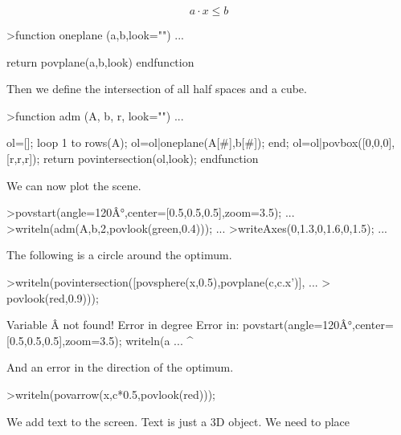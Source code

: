 \documentclass[a4paper,10pt]{article}
\begin{document}
\begin{eulernotebook}
\begin{eulercomment}
\end{eulercomment}
\begin{eulerformula}
\[
a \cdot x \le b
\]
\end{eulerformula}
\begin{eulerprompt}
>function oneplane (a,b,look="") ...
\end{eulerprompt}
\begin{eulerudf}
    return povplane(a,b,look)
  endfunction
\end{eulerudf}
\begin{eulercomment}
Then we define the intersection of all half spaces and a cube.
\end{eulercomment}
\begin{eulerprompt}
>function adm (A, b, r, look="") ...
\end{eulerprompt}
\begin{eulerudf}
    ol=[];
    loop 1 to rows(A); ol=ol|oneplane(A[#],b[#]); end;
    ol=ol|povbox([0,0,0],[r,r,r]);
    return povintersection(ol,look);
  endfunction
\end{eulerudf}
\begin{eulercomment}
We can now plot the scene.
\end{eulercomment}
\begin{eulerprompt}
>povstart(angle=120Â°,center=[0.5,0.5,0.5],zoom=3.5); ...
>writeln(adm(A,b,2,povlook(green,0.4))); ...
>writeAxes(0,1.3,0,1.6,0,1.5); ...
\end{eulerprompt}
\begin{eulercomment}
The following is a circle around the optimum.
\end{eulercomment}
\begin{eulerprompt}
>writeln(povintersection([povsphere(x,0.5),povplane(c,c.x')], ...
>  povlook(red,0.9)));
\end{eulerprompt}
\begin{euleroutput}
  Variable Â not found!
  Error in degree
  Error in:
  povstart(angle=120Â°,center=[0.5,0.5,0.5],zoom=3.5); writeln(a ...
                      ^
\end{euleroutput}
\begin{eulercomment}
And an error in the direction of the optimum.
\end{eulercomment}
\begin{eulerprompt}
>writeln(povarrow(x,c*0.5,povlook(red)));
\end{eulerprompt}
\begin{eulercomment}
We add text to the screen. Text is just a 3D object. We need to place

\end{eulercomment}
\end{eulernotebook}
\end{document}
